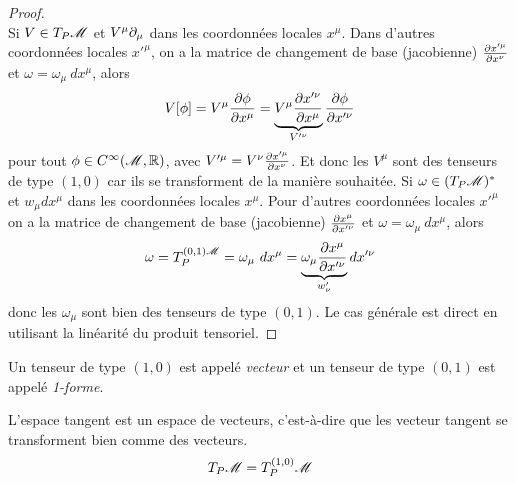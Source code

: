 \documentclass[a4paper,11pt]{report}
\begin{document}
                \begin{proof}${}$\\
                    Si $V\in T_P\mathscr{M}$ et $V^\mu\partial_\mu$ dans les coordonnées locales $x^\mu$. Dans d'autres coordonnées locales $x'^\mu$, on a la matrice de changement de base (jacobienne) $ \frac{\partial x'^\mu}{\partial x^\nu}$ et $\omega = \omega_\mu~dx^\mu$, alors
                    \begin{equation}
                        V[\phi] = V^\mu \frac{\partial\phi}{\partial x^\mu} =  \underbrace{V^\mu\frac{\partial x'^\nu}{\partial x^\mu}}_{V'^\nu}\frac{\partial\phi}{\partial x'^\nu}
                    \end{equation}
                    pour tout $\phi\in C^\infty(\mathscr{M},\mathbb{R})$, avec $V'^\mu = V^\nu\frac{\partial x'^\mu}{\partial x^\nu}$. Et donc les $V^\mu$ sont des tenseurs de type $(1,0)$ car ils se transforment de la manière souhaitée. Si $\omega\in (T_P\mathscr{M})^*$ et $w_\mu dx^\mu$ dans les coordonnées locales $x^\mu$. Pour d'autres coordonnées locales $x'^\mu$ on a la matrice de changement de base (jacobienne) $ \frac{\partial x^\mu}{\partial x'^\nu}$ et $\omega = \omega_\mu~dx^\mu$, alors
                    \begin{equation}
                        \omega = T_P^{(0,1)\mathscr{M}} = \omega_\mu~dx^\mu =  \underbrace{\omega_\mu \frac{\partial x^\mu}{\partial x'^\nu}}_{w'_\nu}dx'^\nu
                    \end{equation}
                    donc les $\omega_\mu$ sont bien des tenseurs de type $(0,1)$. Le cas générale est direct en utilisant la linéarité du produit tensoriel.
                \end{proof}
                
                \begin{definition}
                    Un tenseur de type $(1,0)$ est appelé \textit{vecteur} et un tenseur de type $(0,1)$ est appelé \textit{1-forme}.
                \end{definition}
                
                \begin{prop}\begin{leftbar}
                    L'espace tangent est un espace de vecteurs, c'est-à-dire que les vecteur tangent se transforment bien comme des vecteurs.
                    \begin{equation}
                        T_P\mathscr{M} = T^{(1,0)}_P\mathscr{M}
                    \end{equation}
                \end{leftbar}\end{prop}
                
\end{document}
